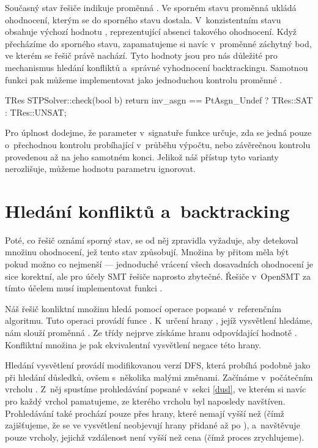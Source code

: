 Současný stav řešiče indikuje proměnná . Ve sporném stavu proměnná ukládá ohodnocení, kterým se do sporného stavu dostala. V~konzistentním stavu obsahuje výchozí hodnotu , reprezentující absenci takového ohodnocení. Když přecházíme do sporného stavu, zapamatujeme si navíc v~proměnné  záchytný bod, ve kterém se řešič právě nachází. Tyto hodnoty jsou pro nás důležité pro mechanismus hledání konfliktů a~správné vyhodnocení backtrackingu. Samotnou funkci  pak můžeme implementovat jako jednoduchou kontrolu proměnné .

\begin{code}
TRes STPSolver::check(bool b) { 
	return inv_asgn == PtAsgn_Undef ? TRes::SAT : TRes::UNSAT; 
}
\end{code}
Pro úplnost dodejme, že parameter  v~signatuře funkce  určuje, zda se jedná pouze o~přechodnou kontrolu probíhající v~průběhu výpočtu, nebo závěrečnou kontrolu provedenou až na jeho samotném konci. Jelikož náš přístup tyto varianty nerozlišuje, můžeme hodnotu parametru ignorovat.

\section{Hledání konfliktů a~backtracking}

Poté, co řešič oznámí sporný stav, se od něj zpravidla vyžaduje, aby detekoval množinu ohodnocení, jež tento stav způsobují. Množina by přitom měla být pokud možno co nejmenší --- jednoduché vrácení všech dosavadních ohodnocení je sice korektní, ale pro účely SMT řešiče naprosto zbytečné. Řešiče v~OpenSMT za tímto účelem musí implementovat funkci .

Náš řešič konliktní množinu hledá pomocí operace  popsané v~referenčním algoritmu. Tuto operaci provádí funce . K~určení hrany , jejíž vysvětlení hledáme, nám slouží proměnná . Ze třídy  nejprve získáme hranu odpovídající hodnotě . Konfliktní množina je pak ekvivalentní vysvětlení negace této hrany. 

Hledání vysvětlení provádí  modifikovanou verzí DFS, která probíhá podobně jako při hledání důsledků, ovšem s~několika malými změnami. Začínáme v~počátečním vrcholu . Z~něj spustíme prohledávání popsané v~sekci \ref{dusl}, ve kterém si navíc pro každý vrchol pamatujeme, ze kterého vrcholu byl naposledy navštíven. Prohledávání také prochází pouze přes hrany, které nemají  vyšší než  (čímž zajišťujeme, že se ve vysvětlení neobjevují hrany přidané až po ), a~navštěvuje pouze vrcholy, jejichž vzdálenost není vyšší než cena  (čímž proces zrychlujeme).

